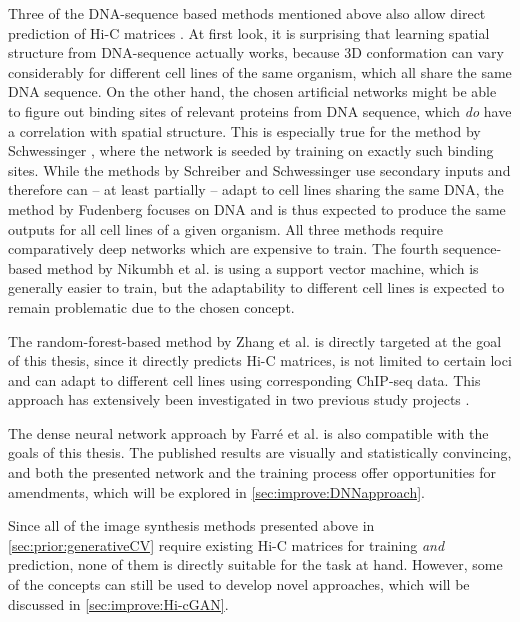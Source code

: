 Three of the DNA-sequence based methods mentioned above also allow direct prediction of Hi-C matrices 
\cite{Schreiber2017, Fudenberg2020, Schwessinger2019}.
At first look, it is surprising that learning spatial structure from DNA-sequence actually works, 
because 3D conformation can vary considerably for different cell lines of the same organism, which all share the same DNA sequence.
On the other hand, the chosen artificial networks might be able to figure out binding sites of relevant proteins from DNA sequence,
which \emph{do} have a correlation with spatial structure. 
This is especially true for the method by Schwessinger \cite{Schwessinger2019},
where the network is seeded by training on exactly such binding sites.
While the methods by Schreiber and Schwessinger use secondary inputs and therefore can -- at least partially -- 
adapt to cell lines sharing the same DNA, the method by Fudenberg focuses on DNA and is thus 
expected to produce the same outputs for all cell lines of a given organism.
All three methods require comparatively deep networks which are expensive to train.
The fourth sequence-based method by Nikumbh et al. \cite{Nikumbh2017} is using a support vector machine, which is generally easier to train,
but the adaptability to different cell lines is expected to remain problematic due to the chosen concept.

The random-forest-based method by Zhang et al. \cite{Zhang2019} is directly targeted at the goal of this thesis,
since it directly predicts Hi-C matrices, is not limited to certain loci and can adapt to different cell lines using 
corresponding ChIP-seq data.
This approach has extensively been investigated in two previous study projects \cite{Krauth2020,Bajorat2019}.

The dense neural network approach by Farr\'e et al. \cite{Farre2018a} is also compatible with the goals of this thesis.
The published results are visually and statistically convincing, and both the presented network and the training process offer
opportunities for amendments, which will be explored in \cref{sec:improve:DNNapproach}.

Since all of the image synthesis methods presented above in \cref{sec:prior:generativeCV} require existing Hi-C matrices 
for training \emph{and} prediction, none of them is directly suitable for the task at hand.
However, some of the concepts can still be used to develop novel approaches, which will be discussed in \cref{sec:improve:Hi-cGAN}.
\clearpage
